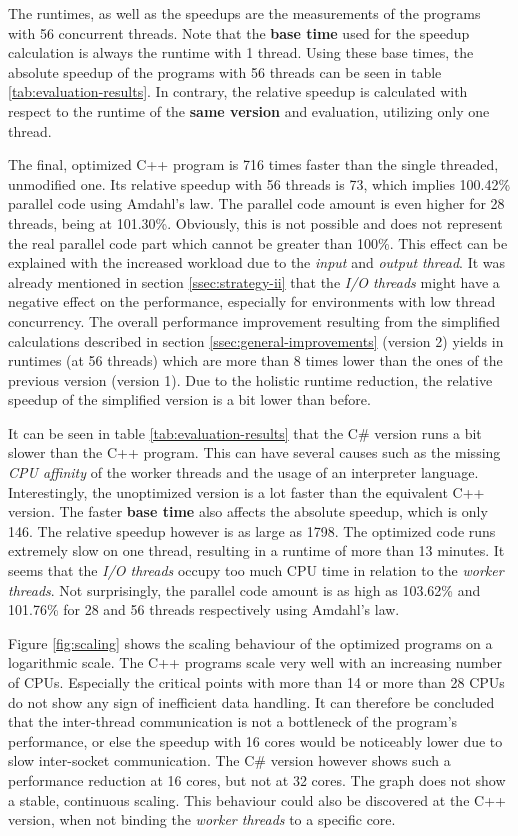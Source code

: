 The runtimes, as well as the speedups are the measurements of the programs with 56 concurrent threads. Note that the \textbf{base time} used for the speedup calculation is always the runtime with 1 thread. Using these base times, the absolute speedup of the programs with 56 threads can be seen in table \ref{tab:evaluation-results}. In contrary, the relative speedup is calculated with respect to the runtime of the \textbf{same version} and evaluation, utilizing only one thread.

The final, optimized C++ program is 716 times faster than the single threaded, unmodified one. Its relative speedup with 56 threads is 73, which implies 100.42\% parallel code using Amdahl's law. The parallel code amount is even higher for 28 threads, being at 101.30\%. Obviously, this is not possible and does not represent the real parallel code part which cannot be greater than 100\%. This effect can be explained with the increased workload due to the \textit{input} and \textit{output thread}. It was already mentioned in section \ref{ssec:strategy-ii} that the \textit{I/O threads} might have a negative effect on the performance, especially for environments with low thread concurrency. The overall performance improvement resulting from the simplified calculations described in section \ref{ssec:general-improvements} (version 2) yields in runtimes (at 56 threads) which are more than 8 times lower than the ones of the previous version (version 1). Due to the holistic runtime reduction, the relative speedup of the simplified version is a bit lower than before.

It can be seen in table \ref{tab:evaluation-results} that the C\# version runs a bit slower than the C++ program. This can have several causes such as the missing \textit{CPU affinity} of the worker threads and the usage of an interpreter language. Interestingly, the unoptimized version is a lot faster than the equivalent C++ version. The faster \textbf{base time} also affects the absolute speedup, which is only 146. The relative speedup however is as large as 1798. The optimized code runs extremely slow on one thread, resulting in a runtime of more than 13 minutes. It seems that the \textit{I/O threads} occupy too much CPU time in relation to the \textit{worker threads}. Not surprisingly, the parallel code amount is as high as 103.62\% and 101.76\% for 28 and 56 threads respectively using Amdahl's law.

Figure \ref{fig:scaling} shows the scaling behaviour of the optimized programs on a logarithmic scale. The C++ programs scale very well with an increasing number of CPUs. Especially the critical points with more than 14 or more than 28 CPUs do not show any sign of inefficient data handling. It can therefore be concluded that the inter-thread communication is not a bottleneck of the program's performance, or else the speedup with 16 cores would be noticeably lower due to slow inter-socket communication. The C\# version however shows such a performance reduction at 16 cores, but not at 32 cores. The graph does not show a stable, continuous scaling. This behaviour could also be discovered at the C++ version, when not binding the \textit{worker threads} to a specific core.

